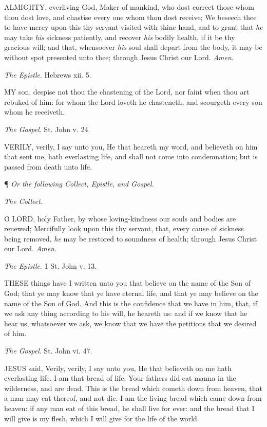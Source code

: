 ALMIGHTY,
everliving God, Maker of mankind, who dost correct those whom thou dost
love, and chastise every one whom thou dost receive; We beseech thee
to have mercy upon this thy servant visited with thine hand, and to
grant that \emph{he} may take \emph{his} sickness patiently, and
recover \emph{his} bodily health, if it be thy gracious will; and
that, whensoever \emph{his} soul shall depart from the body, it may
be without spot presented unto thee; through Jesus Christ our Lord.
\emph{Amen}.

\emph{The
Epistle}. Hebrews xii. 5.

MY
son, despise not thou the chastening of the Lord, nor faint when thou
art rebuked of him: for whom the Lord loveth he chasteneth, and scourgeth
every son whom he receiveth.

\emph{The
Gospel}. St. John v. 24.

VERILY,
verily, I say unto you, He that heareth my word, and believeth on him
that sent me, hath everlasting life, and shall not come into condemnation;
but is passed from death unto life.

¶
\emph{Or the following Collect, Epistle, and Gospel.}

\emph{The
Collect.}

O
LORD, holy Father, by whose loving-kindness our souls and bodies are
renewed; Mercifully look upon this thy servant, that, every cause of
sickness being removed, \emph{he} may be restored to soundness of
health; through Jesus Christ our Lord. \emph{Amen}.

\emph{The
Epistle}. 1 St. John v. 13.

THESE
things have I written unto you that believe on the name of the Son of
God; that ye may know that ye have eternal life, and that ye may believe
on the name of the Son of God. And this is the confidence that we have
in him, that, if we ask any thing according to his will, he heareth
us: and if we know that he hear us, whatsoever we ask, we know that
we have the petitions that we desired of him.

\emph{The
Gospel}. St. John vi. 47.

JESUS
said, Verily, verily, I say unto you, He that believeth on me hath everlasting
life. I am that bread of life. Your fathers did eat manna in the wilderness,
and are dead. This is the bread which cometh down from heaven, that
a man may eat thereof, and not die. I am the living bread which came
down from heaven: if any man eat of this bread, he shall live for ever:
and the bread that I will give is my flesh, which I will give for the
life of the world.

